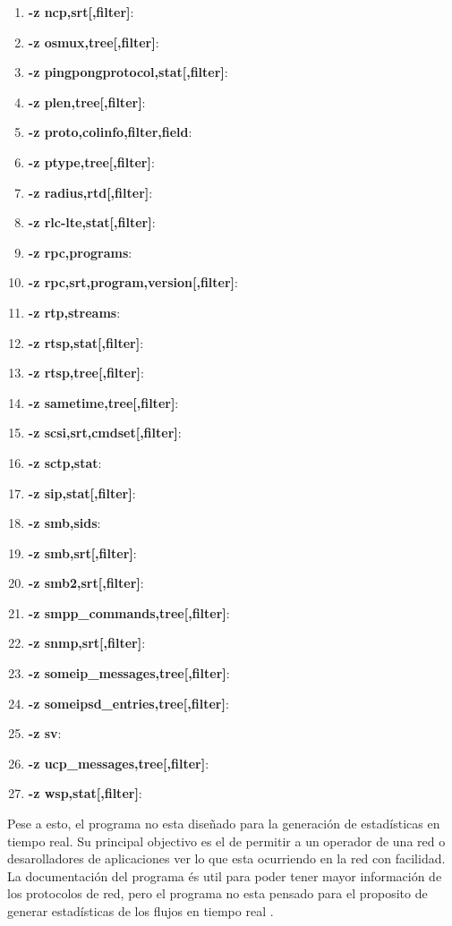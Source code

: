 \begin{enumerate}
    \item \textbf{-z ncp,srt[,filter]}: 
    \item \textbf{-z osmux,tree[,filter]}: 
    \item \textbf{-z pingpongprotocol,stat[,filter]}: 
    \item \textbf{-z plen,tree[,filter]}: 
    \item \textbf{-z proto,colinfo,filter,field}: 
    \item \textbf{-z ptype,tree[,filter]}: 
    \item \textbf{-z radius,rtd[,filter]}: 
    \item \textbf{-z rlc-lte,stat[,filter]}: 
    \item \textbf{-z rpc,programs}: 
    \item \textbf{-z rpc,srt,program,version[,filter]}: 
    \item \textbf{-z rtp,streams}: 
    \item \textbf{-z rtsp,stat[,filter]}: 
    \item \textbf{-z rtsp,tree[,filter]}: 
    \item \textbf{-z sametime,tree[,filter]}: 
    \item \textbf{-z scsi,srt,cmdset[,filter]}: 
    \item \textbf{-z sctp,stat}: 
    \item \textbf{-z sip,stat[,filter]}: 
    \item \textbf{-z smb,sids}: 
    \item \textbf{-z smb,srt[,filter]}: 
    \item \textbf{-z smb2,srt[,filter]}: 
    \item \textbf{-z smpp\_commands,tree[,filter]}: 
    \item \textbf{-z snmp,srt[,filter]}: 
    \item \textbf{-z someip\_messages,tree[,filter]}: 
    \item \textbf{-z someipsd\_entries,tree[,filter]}: 
    \item \textbf{-z sv}: 
    \item \textbf{-z ucp\_messages,tree[,filter]}: 
    \item \textbf{-z wsp,stat[,filter]}: 
\end{enumerate}

Pese a esto, el programa no esta diseñado para la generación de estadísticas en tiempo real. Su principal objectivo es el de permitir a un operador de una red o desarolladores de aplicaciones ver lo que esta ocurriendo en la red con facilidad. La documentación del programa és util para poder tener mayor información de los protocolos de red, pero el programa no esta pensado para el proposito de generar estadísticas de los flujos en tiempo real \cite{wiresharkrealtimestats}.

